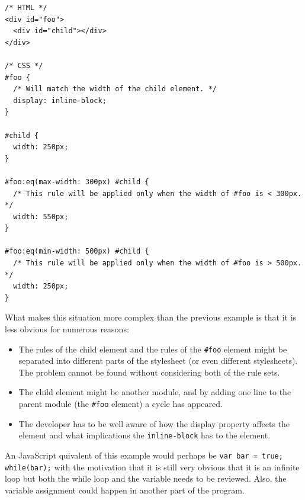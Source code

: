 \documentclass[a4paper,11pt]{kth-mag}
\newcommand{\code}[1]{\texttt{#1}}
\begin{document}
          \begin{lstlisting}[caption={Example of indirect cyclic rules.}, captionpos=b, label={code:cyclic-2}]
/* HTML */
<div id="foo">
  <div id="child"></div>
</div>

/* CSS */
#foo {
  /* Will match the width of the child element. */
  display: inline-block;
}

#child {
  width: 250px;
}

#foo:eq(max-width: 300px) #child {
  /* This rule will be applied only when the width of #foo is < 300px. */
  width: 550px;
}

#foo:eq(min-width: 500px) #child {
  /* This rule will be applied only when the width of #foo is > 500px. */
  width: 250px;
}
          \end{lstlisting}
          What makes this situation more complex than the previous example is that it is less obvious for numerous reasons:
          \begin{itemize}
            \item The rules of the child element and the rules of the \code{\#foo} element might be separated into different parts of the stylesheet (or even different stylesheets).
            The problem cannot be found without considering both of the rule sets.
            \item The child element might be another module, and by adding one line to the parent module (the \code{\#foo} element) a cycle has appeared.
            \item The developer has to be well aware of how the display property affects the element and what implications the \code{inline-block} has to the element.
          \end{itemize}
          An JavaScript quivalent of this example would perhaps be \code{var bar = true; while(bar);} with the motivation that it is still very obvious that it is an infinite loop but both the while loop and the variable needs to be reviewed.
          Also, the variable assignment could happen in another part of the program.
\end{document}
